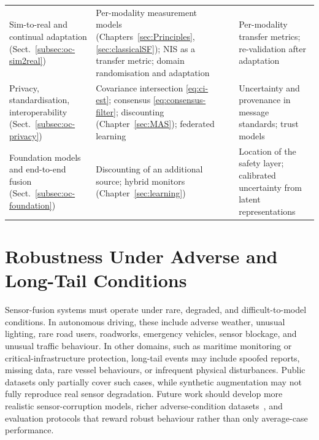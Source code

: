 \documentclass[graybox,envcountchap]{style/SNmono}
\newcommand{\pmark}{\textcolor{MarkerOrange}{\ding{108}}}
\newcommand{\xmark}{\textcolor{red}{\ding{55}}}
\begin{document}
\begin{table}[!t]
\begin{tabular}{>{\raggedright\arraybackslash}p{} >{\raggedright\arraybackslash}p{} c >{\raggedright\arraybackslash}p{}}
Sim-to-real and continual adaptation (Sect.~\ref{subsec:oc-sim2real}) & Per-modality measurement models (Chapters~\ref{sec:Principles}, \ref{sec:classicalSF}); NIS as a transfer metric; domain randomisation and adaptation & \pmark & Per-modality transfer metrics; re-validation after adaptation \\[2pt]
Privacy, standardisation, interoperability (Sect.~\ref{subsec:oc-privacy}) & Covariance intersection \eqref{eq:ci-est}; consensus \eqref{eq:consensus-filter}; discounting (Chapter~\ref{sec:MAS}); federated learning & \xmark & Uncertainty and provenance in message standards; trust models \\[2pt]
Foundation models and end-to-end fusion (Sect.~\ref{subsec:oc-foundation}) & Discounting of an additional source; hybrid monitors (Chapter~\ref{sec:learning}) & \xmark & Location of the safety layer; calibrated uncertainty from latent representations \\
\bottomrule
\end{tabular}
\end{table}

\section{Robustness Under Adverse and Long-Tail Conditions}
\label{subsec:oc-robustness}

Sensor-fusion systems must operate under rare, degraded, and difficult-to-model conditions. In autonomous driving, these include adverse weather, unusual lighting, rare road users, roadworks, emergency vehicles, sensor blockage, and unusual traffic behaviour. In other domains, such as maritime monitoring or critical-infrastructure protection, long-tail events may include spoofed reports, missing data, rare vessel behaviours, or infrequent physical disturbances. Public datasets only partially cover such cases, while synthetic augmentation may not fully reproduce real sensor degradation. Future work should develop more realistic sensor-corruption models, richer adverse-condition datasets~\cite{bijelic2020_stf,dong2023_robobev}, and evaluation protocols that reward robust behaviour rather than only average-case performance.
\end{document}
